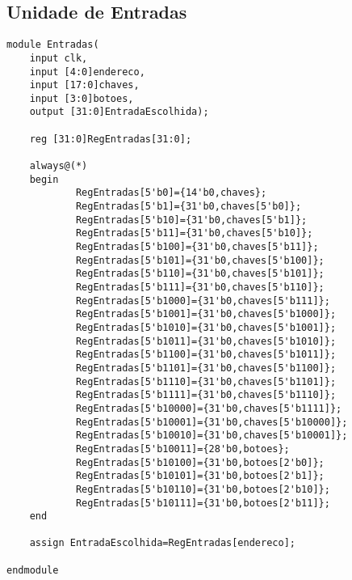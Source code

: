 \subsection{Unidade de Entradas}
\begin{lstlisting}
module Entradas(
	input clk,
	input [4:0]endereco,
	input [17:0]chaves,
	input [3:0]botoes,
	output [31:0]EntradaEscolhida);
	
	reg [31:0]RegEntradas[31:0];
	
	always@(*)
	begin
			RegEntradas[5'b0]={14'b0,chaves};
			RegEntradas[5'b1]={31'b0,chaves[5'b0]};
			RegEntradas[5'b10]={31'b0,chaves[5'b1]};
			RegEntradas[5'b11]={31'b0,chaves[5'b10]};
			RegEntradas[5'b100]={31'b0,chaves[5'b11]};
			RegEntradas[5'b101]={31'b0,chaves[5'b100]};
			RegEntradas[5'b110]={31'b0,chaves[5'b101]};
			RegEntradas[5'b111]={31'b0,chaves[5'b110]};
			RegEntradas[5'b1000]={31'b0,chaves[5'b111]};
			RegEntradas[5'b1001]={31'b0,chaves[5'b1000]};
			RegEntradas[5'b1010]={31'b0,chaves[5'b1001]};
			RegEntradas[5'b1011]={31'b0,chaves[5'b1010]};
			RegEntradas[5'b1100]={31'b0,chaves[5'b1011]};
			RegEntradas[5'b1101]={31'b0,chaves[5'b1100]};
			RegEntradas[5'b1110]={31'b0,chaves[5'b1101]};
			RegEntradas[5'b1111]={31'b0,chaves[5'b1110]};
			RegEntradas[5'b10000]={31'b0,chaves[5'b1111]};
			RegEntradas[5'b10001]={31'b0,chaves[5'b10000]};
			RegEntradas[5'b10010]={31'b0,chaves[5'b10001]};
			RegEntradas[5'b10011]={28'b0,botoes};
			RegEntradas[5'b10100]={31'b0,botoes[2'b0]};
			RegEntradas[5'b10101]={31'b0,botoes[2'b1]};
			RegEntradas[5'b10110]={31'b0,botoes[2'b10]};
			RegEntradas[5'b10111]={31'b0,botoes[2'b11]};
	end
	
	assign EntradaEscolhida=RegEntradas[endereco];
	
endmodule

\end{lstlisting}
\clearpage

